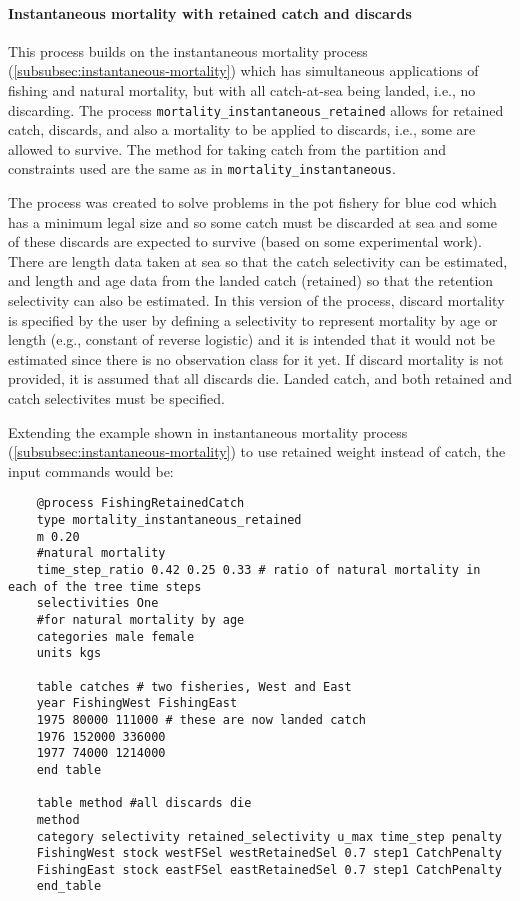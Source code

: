 \paragraph{Instantaneous mortality with retained catch and discards}

This process builds on the instantaneous mortality process (\ref{subsubsec:instantaneous-mortality}) which has simultaneous applications of fishing and natural
mortality, but with all catch-at-sea being landed, i.e., no discarding. The process \texttt{mortality\_instantaneous\_retained} allows for retained catch, discards, and also a mortality to be applied to discards, i.e., some are allowed to survive. The method for taking catch from the partition and constraints used are the same as in \texttt{mortality\_instantaneous}.

The process was created to solve problems in the pot fishery for blue cod which has a minimum legal size and so some catch must be discarded at sea and some of these discards are expected to survive (based on some experimental work). There are length data taken at sea so that the catch selectivity can be estimated, and length and age data from the landed catch (retained) so that the retention selectivity can also be estimated. In this version of the process, discard mortality is specified by the user by defining a selectivity to represent mortality by age or length (e.g., constant of reverse logistic) and it is intended that it would not be estimated since there is no observation class for it yet. If discard mortality is not provided, it is assumed that all discards die. Landed catch, and both retained and catch selectivites must be specified.

Extending the example shown in instantaneous mortality process (\ref{subsubsec:instantaneous-mortality}) to use retained weight instead of catch, the input commands would be:

{\small{\begin{verbatim}
	@process FishingRetainedCatch
	type mortality_instantaneous_retained
	m 0.20
	#natural mortality
	time_step_ratio 0.42 0.25 0.33 # ratio of natural mortality in each of the tree time steps
	selectivities One
	#for natural mortality by age
	categories male female
	units kgs

	table catches # two fisheries, West and East
	year FishingWest FishingEast
	1975 80000 111000 # these are now landed catch
	1976 152000 336000
	1977 74000 1214000
	end table

	table method #all discards die
	method
	category selectivity retained_selectivity u_max time_step penalty
	FishingWest stock westFSel westRetainedSel 0.7 step1 CatchPenalty
	FishingEast stock eastFSel eastRetainedSel 0.7 step1 CatchPenalty
	end_table
	\end{verbatim}}}

